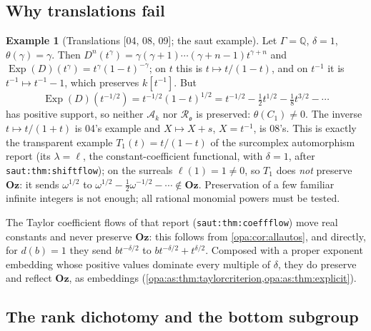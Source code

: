 \documentclass[11pt,oneside]{article}
\numberwithin{equation}{section}
\theoremstyle{definition}
\newtheorem{example}[example]{Example}
\theoremstyle{remark}
\newcommand{\Oz}{\mathbf{Oz}}
\newcommand{\Q}{\mathbb Q}
\newcommand{\oo}{\mathfrak o}
\newcommand{\Ak}{\mathcal A_k}
\newcommand{\Ro}{\mathcal R_{\oo}}
\newcommand{\Exp}{\operatorname{Exp}}
\newcommand{\src}[1]{\textup{\textsf{\small[#1]}}}
\newcommand{\lbl}[1]{\nolinkurl{#1}}
\begin{document}
\subsection{Why translations fail}

\begin{example}[Translations \src{04, 08, 09}; the saut example]\label{opa:ex:translation}
Let $\Gamma=\Q$, $\delta=1$, $\theta(\gamma)=\gamma$. Then
$D^n(t^\gamma)=\gamma(\gamma+1)\cdots(\gamma+n-1)t^{\gamma+n}$ and
$\Exp(D)(t^\gamma)=t^\gamma(1-t)^{-\gamma}$; on $t$ this is
$t\mapsto t/(1-t)$, and on $t^{-1}$ it is $t^{-1}\mapsto t^{-1}-1$, which
preserves $k[t^{-1}]$. But
\[
 \Exp(D)(t^{-1/2})=t^{-1/2}(1-t)^{1/2}=t^{-1/2}-\tfrac12t^{1/2}-\tfrac18t^{3/2}-\cdots
\]
has positive support, so neither $\Ak$ nor $\Ro$ is preserved: $\theta(C_1)\ne0$.
The inverse $t\mapsto t/(1+t)$ is 04's example and $X\mapsto X+s$, $X=t^{-1}$, is
08's. This is exactly the transparent example $T_1(t)=t/(1-t)$ of the
surcomplex automorphism report (its $\lambda=\ell$, the constant-coefficient
functional, with $\delta=1$, after \lbl{saut:thm:shiftflow}); on the surreals
$\ell(1)=1\ne0$, so $T_1$ does \emph{not} preserve $\Oz$: it sends
$\omega^{1/2}$ to $\omega^{1/2}-\tfrac12\omega^{-1/2}-\cdots\notin\Oz$. Preservation
of a few familiar infinite integers is not enough; all rational monomial powers
must be tested.
\end{example}

The Taylor coefficient flows of that report (\lbl{saut:thm:coeffflow}) move
real constants and never preserve $\Oz$: this follows from
\cref{opa:cor:allautos}, and directly, for $d(b)=1$ they send
$bt^{-\delta/2}$ to $bt^{-\delta/2}+t^{\delta/2}$. Composed with a proper
exponent embedding whose positive values dominate every multiple of $\delta$,
they do preserve and reflect $\Oz$, as embeddings
(\cref{opa:as:thm:taylorcriterion,opa:as:thm:explicit}).

\subsection{The rank dichotomy and the bottom subgroup}
\end{document}
